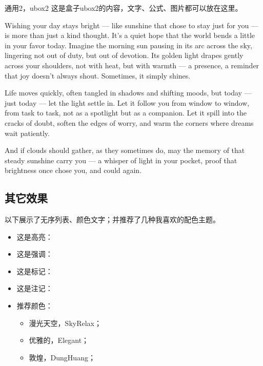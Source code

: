 \begin{ubox2}{通用2，ubox2}
	这是盒子ubox2的内容，文字、公式、图片都可以放在这里。
	
	Wishing your day stays bright — like sunshine that chose to stay just for you — is more than just a kind thought. It’s a quiet hope that the world bends a little in your favor today. Imagine the morning sun pausing in its arc across the sky, lingering not out of duty, but out of devotion. Its golden light drapes gently across your shoulders, not with heat, but with warmth — a presence, a reminder that joy doesn’t always shout. Sometimes, it simply shines.
	
	Life moves quickly, often tangled in shadows and shifting moods, but today — just today — let the light settle in. Let it follow you from window to window, from task to task, not as a spotlight but as a companion. Let it spill into the cracks of doubt, soften the edges of worry, and warm the corners where dreams wait patiently.
	
	And if clouds should gather, as they sometimes do, may the memory of that steady sunshine carry you — a whisper of light in your pocket, proof that brightness once chose you, and could again.
\end{ubox2}

\subsection{其它效果}

以下展示了无序列表、颜色文字；并推荐了几种我喜欢的配色主题。

\begin{itemize}
	\item 这是高亮：
	\item 这是强调：
	\item 这是标记：
	\item 这是注记：
	\item 推荐颜色：
	\begin{itemize}
		\item 漫光天空，SkyRelax；
		\item 优雅的，Elegant；
		\item 敦煌，DungHuang；
	\end{itemize}
\end{itemize}

